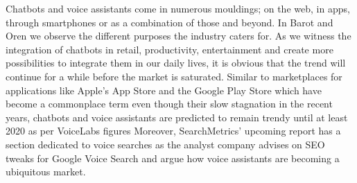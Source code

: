Chatbots and voice assistants come in numerous mouldings; on the web, in apps, through smartphones or as a combination of those and beyond. In Barot and Oren \cite{guidetochat} we observe the different purposes the industry caters for. As we witness the integration of chatbots in retail, productivity, entertainment and create more possibilities to integrate them in our daily lives, it is obvious that the trend will continue for a while before the market is saturated. Similar to marketplaces for applications like Apple's App Store and the Google Play Store which have become a commonplace term even though their slow stagnation in the recent years, chatbots and voice assistants are predicted to remain trendy until at least 2020 as per VoiceLabs figures %
Moreover, SearchMetrics' upcoming report has a section dedicated to voice searches as the analyst company advises on SEO tweaks for Google Voice Search \cite{searchmetrics:blog} and argue how voice assistants are becoming a ubiquitous market.


